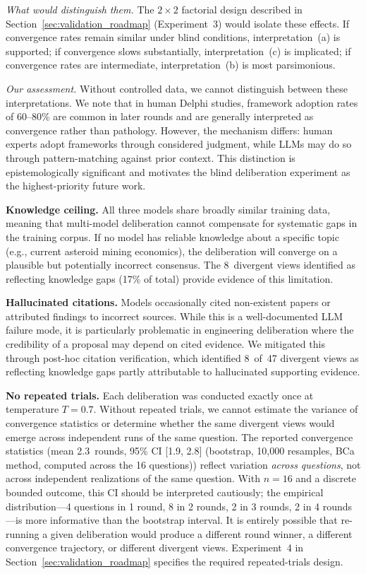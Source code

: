 \documentclass[11pt,a4paper]{article}
\begin{document}
\emph{What would distinguish them.} The $2\times2$ factorial design described in Section~\ref{sec:validation_roadmap} (Experiment~3) would isolate these effects. If convergence rates remain similar under blind conditions, interpretation~(a) is supported; if convergence slows substantially, interpretation~(c) is implicated; if convergence rates are intermediate, interpretation~(b) is most parsimonious.

\emph{Our assessment.} Without controlled data, we cannot distinguish between these interpretations. We note that in human Delphi studies, framework adoption rates of 60--80\% are common in later rounds and are generally interpreted as convergence rather than pathology. However, the mechanism differs: human experts adopt frameworks through considered judgment, while LLMs may do so through pattern-matching against prior context. This distinction is epistemologically significant and motivates the blind deliberation experiment as the highest-priority future work.

\textbf{Knowledge ceiling.} All three models share broadly similar training data, meaning that multi-model deliberation cannot compensate for systematic gaps in the training corpus. If no model has reliable knowledge about a specific topic (e.g., current asteroid mining economics), the deliberation will converge on a plausible but potentially incorrect consensus. The 8~divergent views identified as reflecting knowledge gaps (17\% of total) provide evidence of this limitation.

\textbf{Hallucinated citations.} Models occasionally cited non-existent papers or attributed findings to incorrect sources. While this is a well-documented LLM failure mode, it is particularly problematic in engineering deliberation where the credibility of a proposal may depend on cited evidence. We mitigated this through post-hoc citation verification, which identified 8~of~47 divergent views as reflecting knowledge gaps partly attributable to hallucinated supporting evidence.

\textbf{No repeated trials.} Each deliberation was conducted exactly once at temperature $T = 0.7$. Without repeated trials, we cannot estimate the variance of convergence statistics or determine whether the same divergent views would emerge across independent runs of the same question. The reported convergence statistics (mean 2.3~rounds, 95\% CI [1.9, 2.8] (bootstrap, 10,000 resamples, BCa method, computed across the 16 questions)) reflect variation \emph{across questions}, not across independent realizations of the same question. With $n=16$ and a discrete bounded outcome, this CI should be interpreted cautiously; the empirical distribution---4 questions in 1 round, 8 in 2 rounds, 2 in 3 rounds, 2 in 4 rounds---is more informative than the bootstrap interval. It is entirely possible that re-running a given deliberation would produce a different round winner, a different convergence trajectory, or different divergent views. Experiment~4 in Section~\ref{sec:validation_roadmap} specifies the required repeated-trials design.
\end{document}
